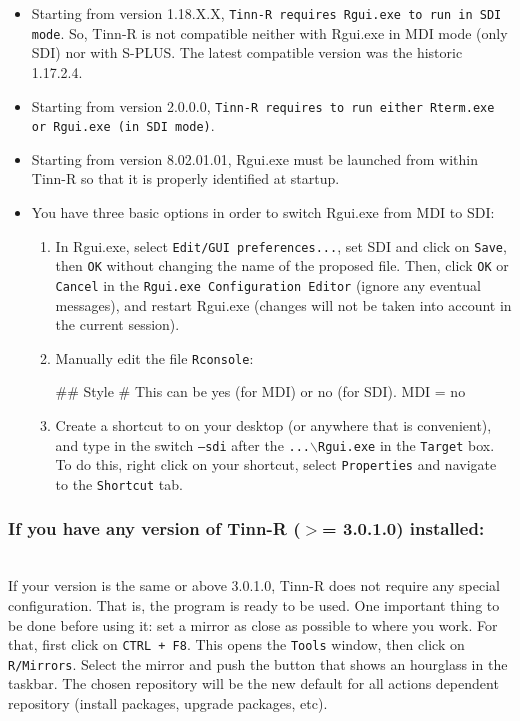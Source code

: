 \begin{itemize}
  \item Starting from version 1.18.X.X, \texttt{Tinn-R requires
      Rgui.exe to run in SDI mode}. So, Tinn-R is not compatible neither
    with Rgui.exe in MDI mode (only SDI) nor with S-PLUS. The
    latest compatible version was the historic 1.17.2.4.
  \item Starting from version 2.0.0.0, \texttt{Tinn-R requires
      \RR{} to run either Rterm.exe or Rgui.exe (in SDI mode)}.
  \item Starting from version 8.02.01.01, Rgui.exe must be launched from within Tinn-R so that it is properly
          identified at startup.
  \item You have three basic options in order to switch Rgui.exe from
    MDI to SDI:
    \begin{enumerate}
      \item In Rgui.exe, select \texttt{Edit/GUI preferences...},
        set SDI and click on \texttt{Save}, then \texttt{OK}
        without changing the name of the proposed file. Then,
        click \texttt{OK} or \texttt{Cancel} in the
        \texttt{Rgui.exe Configuration Editor} (ignore any eventual
        messages), and restart Rgui.exe (changes will not be taken
        into account in the current session).
      \item Manually edit the file \texttt{Rconsole}:
        \begin{Scode}
          ## Style
          # This can be yes (for MDI) or no (for SDI).
          MDI = no
        \end{Scode}
      \item Create a shortcut to \RR{} on your desktop (or anywhere that is convenient),
        and type in the switch \texttt{--sdi} after the \texttt{...$\backslash$Rgui.exe}
        in the \texttt{Target} box. To do this, right click on your shortcut, select
        \texttt{Properties} and navigate to the \texttt{Shortcut} tab.
    \end{enumerate}
\end{itemize}


\subsubsection{If you have any version of Tinn-R ($>$= 3.0.1.0) installed:}\\

If your version is the same or above 3.0.1.0, Tinn-R does not require any special configuration.
That is, the program is ready to be used. One important thing to be done before using it:
set a \RR{} mirror as close as possible to where you work. For that, first click on \texttt{CTRL + F8}.
This opens the \texttt{Tools} window, then click on \texttt{R/Mirrors}.
Select the \RR{} mirror and push the button that shows an hourglass in the taskbar.
The chosen repository will be the new default for all actions dependent repository
(install packages, upgrade packages, etc).


